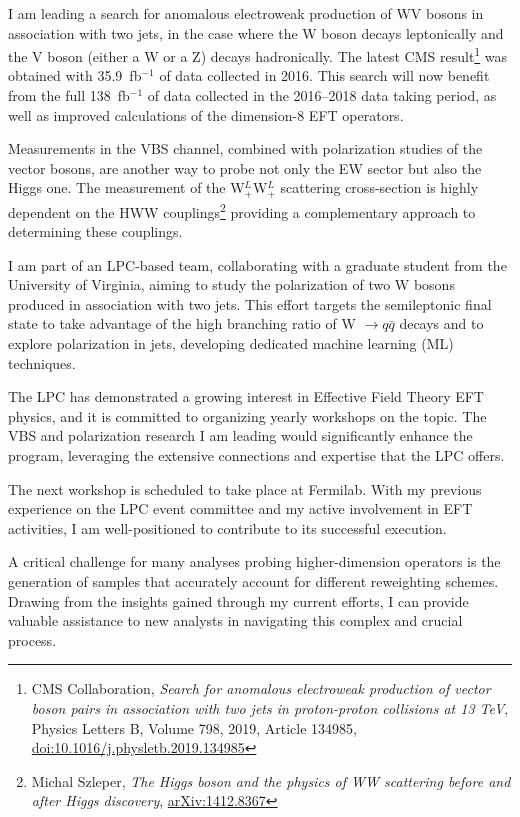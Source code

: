 {\begin{flushleft}
I am leading a search for anomalous electroweak production of WV bosons in association with two jets, in the case where the W boson decays leptonically and the V boson (either a W or a Z) decays hadronically.
The latest CMS result\footnote{CMS Collaboration, {\em Search for anomalous electroweak production of vector boson pairs in association with two jets in proton-proton collisions at 13 TeV}, Physics Letters B, Volume 798, 2019, Article 134985, \href{https://doi.org/10.1016/j.physletb.2019.134985}{doi:10.1016/j.physletb.2019.134985}} was obtained with 35.9~fb$^{-1}$ of data collected in 2016. This search will now benefit from the full 138~fb$^{-1}$ of data collected in the 2016--2018 data taking period, as well as improved calculations of the dimension-8 EFT operators.

Measurements in the VBS channel, combined with polarization studies of the vector bosons, are another way to probe not only the EW sector but also the Higgs one.
The measurement of the  W$^L_+$W$^L_+$ scattering cross-section is highly dependent on the HWW couplings\footnote{Michal Szleper, {\em The Higgs boson and the physics of WW scattering before and after Higgs discovery}, \href{https://arxiv.org/pdf/1412.8367}{arXiv:1412.8367}} providing a complementary approach to determining these couplings. 

I am part of an LPC-based team, collaborating with a graduate student from the University of Virginia, aiming to study the polarization of two W bosons produced in association with two jets. This effort targets the semileptonic final state to take advantage of the high branching ratio of W $\to q\bar{q}$ decays and to explore polarization in jets, developing dedicated machine learning (ML) techniques. 

\vspace{\baselineskip}
 
The LPC has demonstrated a growing interest in Effective Field Theory EFT physics, and it is committed to organizing yearly workshops on the topic. The VBS and polarization research I am leading would significantly enhance the program, leveraging the extensive connections and expertise that the LPC offers.

The next workshop is scheduled to take place at Fermilab. With my previous experience on the LPC event committee and my active involvement in EFT activities, I am well-positioned to contribute to its successful execution.

A critical challenge for many analyses probing higher-dimension operators is the generation of samples that accurately account for different reweighting schemes. Drawing from the insights gained through my current efforts, I can provide valuable assistance to new analysts in navigating this complex and crucial process.


\end{flushleft}}
